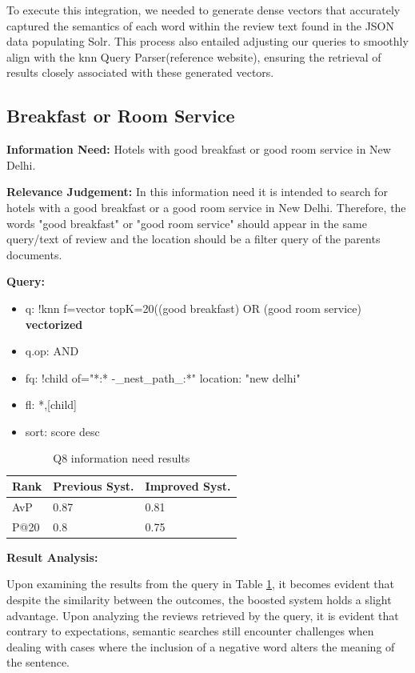 \documentclass[sigconf]{acmart}
\begin{document}
To execute this integration, we needed to generate dense vectors that accurately captured the semantics of each word within the review text found in the JSON data populating Solr. This process also entailed adjusting our queries to smoothly align with the knn Query Parser(reference website), ensuring the retrieval of results closely associated with these generated vectors.

\renewcommand{\thesubsection}{\Alph{subsection}}

\setcounter{subsection}{0}
\subsection{Breakfast or Room Service}

\textbf{Information Need:} Hotels with good breakfast or good room service in New Delhi.

\textbf{Relevance Judgement:} In this information need it is intended to search for hotels with a good breakfast or a good room service in New Delhi. Therefore, the words "good breakfast" or "good room service" should appear in the same query/text of review and the location should be a filter query of the parents documents.

\textbf{Query:}

\begin{itemize}
    \item q: {!knn f=vector topK=20}((good breakfast) OR (good room service) \textbf{vectorized}
    \item q.op: AND
    \item fq: {!child of="*:* -\_nest\_path\_:*"} location: "new delhi"
    \item fl: *,[child]
    \item sort: score desc
\end{itemize}

\begin{table}[H]
\caption{Q8 information need results}
\label{tab:q8}
\begin{tabular}{lll}
\toprule
Rank & Previous Syst. & Improved Syst.\\
\midrule
AvP & 0.87 & 0.81  \\
P@20 & 0.8 & 0.75 \\
\bottomrule
\end{tabular}
\end{table}

\textbf{Result Analysis:} 

Upon examining the results from the query in Table \ref{tab:q8}, it becomes evident that despite the similarity between the outcomes, the boosted system holds a slight advantage. 
Upon analyzing the reviews retrieved by the query, it is evident that contrary to expectations, semantic searches still encounter challenges when dealing with cases where the inclusion of a negative word alters the meaning of the sentence.
\end{document}
